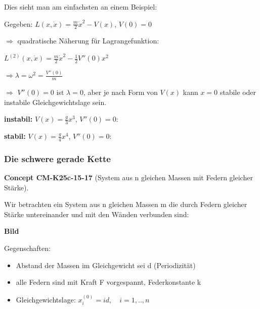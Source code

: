 \documentclass[10pt, letterpaper]{article}
\newcommand{\CustomHeading}[3]{%
  \par\medskip\noindent%
  \textbf{#1 #2} \textnormal{(#3)}.\enskip%
}
\newenvironment{CONC}[2]{\begin{unitbox}\CustomHeading{Concept}{#1}{#2}}{\end{unitbox}}
\begin{document}
Dies sieht man am einfachsten an einem Beispiel:

Gegeben: $L(x,\dot{x}) = \frac{m}{2}\dot{x}^2 - V(x)$, \quad $V(0)=0$

$\Rightarrow$ quadratische Näherung für Lagrangefunktion:

$L^{(2)}(x,\dot{x}) = \frac{m}{2}\dot{x}^2 - \frac{1}{2}V''(0)x^2$

$\Rightarrow \lambda = \omega^2 = \frac{V''(0)}{m}$

$\Rightarrow$ $V''(0)=0$ ist $\lambda=0$, aber je nach Form von $V(x)$ kann $x=0$ stabile oder instabile Gleichgewichtslage sein.

\textbf{instabil:} $V(x)=\frac{g}{3}x^3$, $V''(0)=0$:
\begin{center}
\end{center}

\textbf{stabil:} $V(x)=\frac{g}{4}x^4$, $V''(0)=0$:
\begin{center}
\end{center}



\pagebreak





\subsubsection{Die schwere gerade Kette}

\begin{CONC}{CM-K25c-15-17}{System aus n gleichen Massen mit Federn gleicher Stärke}
Wir betrachten ein System aus n gleichen Massen m die durch Federn gleicher Stärke untereinander und mit den Wänden verbunden sind:

\textbf{Bild}

Gegenschaften:
\begin{itemize}
\item Abstand der Massen im Gleichgewicht sei d (Periodizität)
\item alle Federn sind mit Kraft F vorgespannt, Federkonstante k
\item Gleichgewichtslage: $x_i^{(0)} = id, \quad i=1,..,n$
\end{itemize}
\end{CONC}
\end{document}
